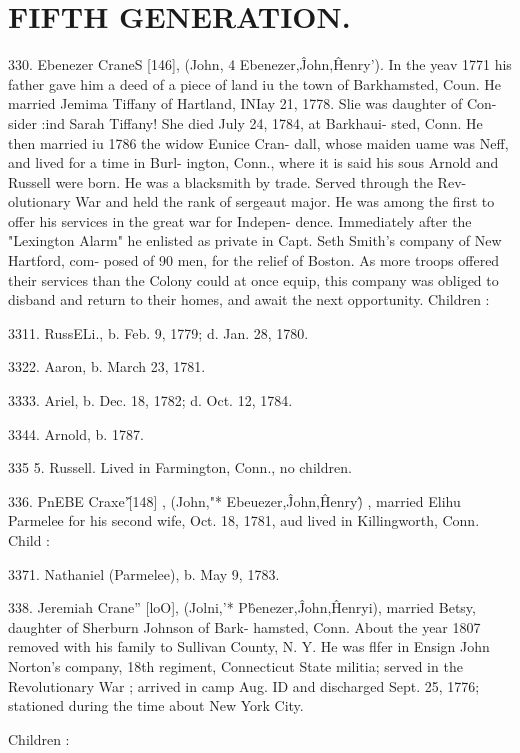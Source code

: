 \documentclass{book}
\begin{document}
\section{FIFTH GENERATION.}


330. Ebenezer CraneS [146], (John, 4 Ebenezer,\^ John,\^ 
Henry'). In the yeav 1771 his father gave him a deed of a piece 
of land iu the town of Barkhamsted, Coun. He married Jemima 
Tiffany of Hartland, INIay 21, 1778. Slie was daughter of Con- 
sider :ind Sarah Tiffany! She died July 24, 1784, at Barkhaui- 
sted, Conn. He then married iu 1786 the widow Eunice Cran- 
dall, whose maiden uame was Neff, and lived for a time in Burl- 
ington, Conn., where it is said his sous Arnold and Russell were 
born. He was a blacksmith by trade. Served through the Rev- 
olutionary War and held the rank of sergeaut major. He was 
among the first to offer his services in the great war for Indepen- 
dence. Immediately after the "Lexington Alarm" he enlisted 
as private in Capt. Seth Smith's company of New Hartford, com- 
posed of 90 men, for the relief of Boston. As more troops 
offered their services than the Colony could at once equip, this 
company was obliged to disband and return to their homes, and 
await the next opportunity. Children : 

3311. RussELi., b. Feb. 9, 1779; d. Jan. 28, 1780. 

3322. Aaron, b. March 23, 1781. 

3333. Ariel, b. Dec. 18, 1782; d. Oct. 12, 1784. 

3344. Arnold, b. 1787. 

335  5. Russell. Lived in Farmington, Conn., no children. 

336. PnEBE Craxe'\^ [148] , (John,"* Ebeuezer,\^ John,\^ Henry\^ ) , 
married Elihu Parmelee for his second wife, Oct. 18, 1781, aud 
lived in Killingworth, Conn. Child : 

3371. Nathaniel (Parmelee), b. May 9, 1783. 

338. Jeremiah Crane'' [loO], (Jolni,'* P\^benezer,\^ John,\^ 
Henryi), married Betsy, daughter of Sherburn Johnson of Bark- 
hamsted, Conn. About the year 1807 removed with his family 
to Sullivan County, N. Y. He was flfer in Ensign John Norton's 
company, 18th regiment, Connecticut State militia; served in the 
Revolutionary War ; arrived in camp Aug. ID and discharged 
Sept. 25, 1776; stationed during the time about New York City. 

Children : 
\end{document}
